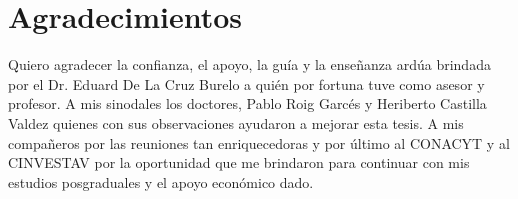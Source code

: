 \tableofcontents
\newpage
\listoffigures
\chapter{Agradecimientos}

Quiero agradecer la confianza, el apoyo, la guía y la enseñanza ardúa brindada por el Dr. Eduard De La Cruz Burelo a quién por fortuna tuve como asesor y profesor. A mis sinodales los doctores, Pablo Roig Garcés y Heriberto Castilla Valdez quienes con sus observaciones ayudaron a mejorar esta tesis. A mis compañeros por las reuniones tan enriquecedoras y por último al CONACYT y al CINVESTAV por la oportunidad que me brindaron para continuar con mis estudios posgraduales y el apoyo económico dado.